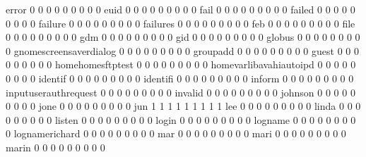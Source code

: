 \documentclass[compress,8pt]{beamer}
\begin{document}
\begin{frame}
\begin{Schunk}
  error                                      0   0   0   0   0   0   0   0   0
  euid                                       0   0   0   0   0   0   0   0   0
  fail                                       0   0   0   0   0   0   0   0   0
  failed                                     0   0   0   0   0   0   0   0   0
  failure                                    0   0   0   0   0   0   0   0   0
  failures                                   0   0   0   0   0   0   0   0   0
  feb                                        0   0   0   0   0   0   0   0   0
  file                                       0   0   0   0   0   0   0   0   0
  gdm                                        0   0   0   0   0   0   0   0   0
  gid                                        0   0   0   0   0   0   0   0   0
  globus                                     0   0   0   0   0   0   0   0   0
  gnomescreensaverdialog                     0   0   0   0   0   0   0   0   0
  groupadd                                   0   0   0   0   0   0   0   0   0
  guest                                      0   0   0   0   0   0   0   0   0
  homehomesftptest                           0   0   0   0   0   0   0   0   0
  homevarlibavahiautoipd                     0   0   0   0   0   0   0   0   0
  identif                                    0   0   0   0   0   0   0   0   0
  identifi                                   0   0   0   0   0   0   0   0   0
  inform                                     0   0   0   0   0   0   0   0   0
  inputuserauthrequest                       0   0   0   0   0   0   0   0   0
  invalid                                    0   0   0   0   0   0   0   0   0
  johnson                                    0   0   0   0   0   0   0   0   0
  jone                                       0   0   0   0   0   0   0   0   0
  jun                                        1   1   1   1   1   1   1   1   1
  lee                                        0   0   0   0   0   0   0   0   0
  linda                                      0   0   0   0   0   0   0   0   0
  listen                                     0   0   0   0   0   0   0   0   0
  login                                      0   0   0   0   0   0   0   0   0
  logname                                    0   0   0   0   0   0   0   0   0
  lognamerichard                             0   0   0   0   0   0   0   0   0
  mar                                        0   0   0   0   0   0   0   0   0
  mari                                       0   0   0   0   0   0   0   0   0
  marin                                      0   0   0   0   0   0   0   0   0

\end{Schunk}
\end{frame}
\end{document}
